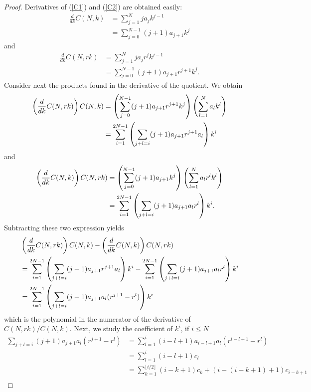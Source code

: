 \begin{proof}
Derivatives of (\ref{C1}) and (\ref{C2}) are obtained easily:
\begin{align*}
\frac{d}{dk}C(N,k) &= \sum_{j=1}^{N}ja_jk^{j-1} \\
&= \sum_{j=0}^{N-1}(j+1) a_{j+1}k^{j}
\end{align*}and
\begin{align*}
\frac{d}{dk}C(N,rk) &= \sum_{j=1}^{N}ja_jr^jk^{j-1} \\
&= \sum_{j=0}^{N-1}(j+1)a_{j+1}r^{j+1}k^{j}. 
\end{align*}Consider next the products found in the derivative of the quotient. We obtain
\begin{align*}
\left(\frac{d}{dk}C(N,rk)\right) C(N,k) &= \left( \sum_{j=0}^{N-1}(j+1)a_{j+1}r^{j+1}k^{j} \right) \left( \sum_{l=1}^{N} a_l  k^l \right) \\
&= \sum_{i = 1}^{2N-1} \left( \sum_{j+l = i} (j+1)a_{j+1}r^{j+1}a_l  \right) k^i
\end{align*}and
\begin{align*}
\left(\frac{d}{dk}C(N,k)\right) C(N,rk) &= \left( \sum_{j=0}^{N-1}(j+1)a_{j+1}k^{j} \right) \left( \sum_{l=1}^{N} a_l  r^lk^l  \right) \\
&= \sum_{i = 1}^{2N-1} \left( \sum_{j+l = i}(j+1)a_{j+1}a_l  r^l   \right) k^i.
\end{align*}
Subtracting these two expression yields
\begin{align*}
&\left(\frac{d}{dk}C(N,rk)\right) C(N,k)-\left(\frac{d}{dk}C(N,k)\right) C(N,rk) \\&= \sum_{i = 1}^{2N-1} \left( \sum_{j+l = i} (j+1)a_{j+1}r^{j+1}a_l  \right) k^i - \sum_{i = 1}^{2N-1} \left( \sum_{j+l = i}(j+1)a_{j+1}a_l  r^l   \right) k^i \\
&= \sum_{i = 1}^{2N-1} \left( \sum_{j+l = i}(j+1)a_{j+1}a_l  (r^{j+1}- r^l)   \right) k^i
\end{align*}which is the polynomial in the numerator of the derivative of $C(N,rk)/C(N,k)$.
Next, we study the coefficient of $k^i$, if $i \leq N$
\begin{align*}
\sum_{j+l = i}(j+1)a_{j+1}a_l  (r^{j+1}- r^l) &= \sum_{l=1}^{i}(i-l+1)a_{i-l+1}a_l  (r^{i-l+1}- r^l) \\
& = \sum_{l=1}^{i}(i-l+1)c_l \\
&= \sum_{k =1}^{\lfloor i / 2 \rfloor}(i-k+1)c_k + (i-(i-k + 1)+1)c_{i-k+1} \\

\end{align*}
\end{proof}
